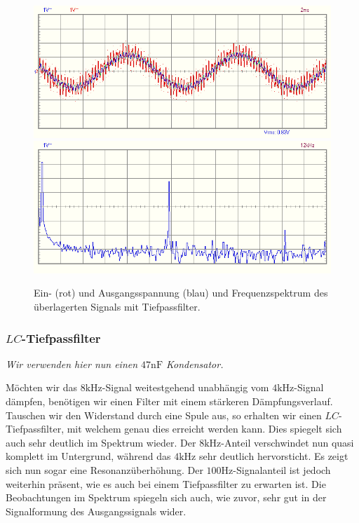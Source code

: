 \begin{figure}[H]
  \centering
  \includegraphics[width=.9\textwidth]{files/aufgabe8_teil2_tiefpass_oszi.png}
  \includegraphics[width=.9\textwidth]{files/aufgabe8_teil2_tiefpass_spectrum.png}
  \caption{Ein- (rot) und Ausgangsspannung (blau) und Frequenzspektrum des überlagerten Signals mit Tiefpassfilter.}
  \label{fig:aufgabe8_teil2_tiefpass}
\end{figure}

\newpage
\subsubsection*{$LC$-Tiefpassfilter}

\small{\textrightarrow\textit{Wir verwenden hier nun einen $47\si{\nano\farad}$ Kondensator.}}
\normalsize

Möchten wir das $8\si{\kilo\hertz}$-Signal weitestgehend unabhängig vom $4\si{\kilo\hertz}$-Signal dämpfen, benötigen wir einen Filter mit einem stärkeren Dämpfungsverlauf. Tauschen wir den Widerstand durch eine Spule aus, so erhalten wir einen $LC$-Tiefpassfilter, mit welchem genau dies erreicht werden kann. Dies spiegelt sich auch sehr deutlich im Spektrum wieder. Der $8\si{\kilo\hertz}$-Anteil verschwindet nun quasi komplett im Untergrund, während das $4\si{\kilo\hertz}$ sehr deutlich hervorsticht. Es zeigt sich nun sogar eine Resonanzüberhöhung. Der $100\si{\hertz}$-Signalanteil ist jedoch weiterhin präsent, wie es auch bei einem Tiefpassfilter zu erwarten ist. Die Beobachtungen im Spektrum spiegeln sich auch, wie zuvor, sehr gut in der Signalformung des Ausgangssignals wider.

